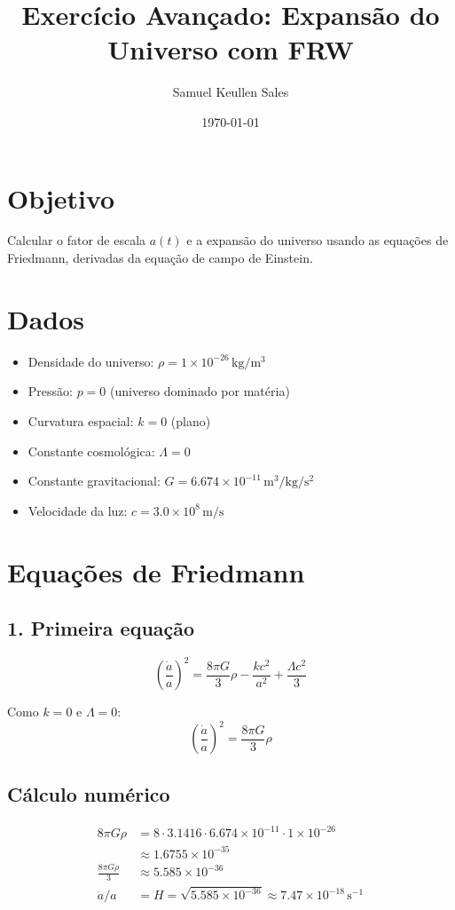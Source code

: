 \documentclass[12pt]{article}
\title{Exercício Avançado: Expansão do Universo com FRW}
\author{Samuel Keullen Sales}
\date{\today}
\begin{document}
\maketitle

\section*{Objetivo}
Calcular o fator de escala \(a(t)\) e a expansão do universo usando as equações de Friedmann, derivadas da equação de campo de Einstein.

\section*{Dados}

\begin{itemize}
    \item Densidade do universo: \(\rho = 1 \times 10^{-26}\, \mathrm{kg/m^3}\)
    \item Pressão: \(p = 0\) (universo dominado por matéria)
    \item Curvatura espacial: \(k = 0\) (plano)
    \item Constante cosmológica: \(\Lambda = 0\)
    \item Constante gravitacional: \(G = 6.674 \times 10^{-11}\, \mathrm{m^3/kg/s^2}\)
    \item Velocidade da luz: \(c = 3.0 \times 10^8\, \mathrm{m/s}\)
\end{itemize}

\section*{Equações de Friedmann}

\subsection*{1. Primeira equação}
\[
\left(\frac{\dot a}{a}\right)^2 = \frac{8 \pi G}{3} \rho - \frac{k c^2}{a^2} + \frac{\Lambda c^2}{3}
\]

Como \(k = 0\) e \(\Lambda = 0\):
\[
\left(\frac{\dot a}{a}\right)^2 = \frac{8 \pi G}{3} \rho
\]

\subsection*{Cálculo numérico}
\begin{align*}
8 \pi G \rho &= 8 \cdot 3.1416 \cdot 6.674 \times 10^{-11} \cdot 1 \times 10^{-26} \\
&\approx 1.6755 \times 10^{-35} \\
\frac{8 \pi G \rho}{3} &\approx 5.585 \times 10^{-36} \\
\dot a / a &= H = \sqrt{5.585 \times 10^{-36}} \approx 7.47 \times 10^{-18}\, \mathrm{s^{-1}}
\end{align*}
\end{document}
